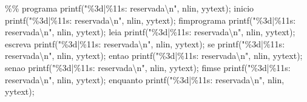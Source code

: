 \documentclass[
  brazilian,
  letterpaper,
]{book}
\newenvironment{Shaded}{\begin{snugshade}}{\end{snugshade}}
\newcommand{\NormalTok}[1]{\textcolor[rgb]{0.00,0.23,0.31}{#1}}
\newcommand{\OperatorTok}[1]{\textcolor[rgb]{0.37,0.37,0.37}{#1}}
\newcommand{\SpecialCharTok}[1]{\textcolor[rgb]{0.37,0.37,0.37}{#1}}
\newcommand{\StringTok}[1]{\textcolor[rgb]{0.13,0.47,0.30}{#1}}
\theoremstyle{plain}
\theoremstyle{definition}
\theoremstyle{remark}
\begin{document}
\begin{Shaded}
\begin{Highlighting}[]
\OperatorTok{\%\%}
\NormalTok{programa      printf}\OperatorTok{(}\StringTok{"}\SpecialCharTok{\%3d}\StringTok{|}\SpecialCharTok{\%11s}\StringTok{: reservada}\SpecialCharTok{\textbackslash{}n}\StringTok{"}\OperatorTok{,}\NormalTok{ nlin}\OperatorTok{,}\NormalTok{ yytext}\OperatorTok{);}
\NormalTok{inicio        printf}\OperatorTok{(}\StringTok{"}\SpecialCharTok{\%3d}\StringTok{|}\SpecialCharTok{\%11s}\StringTok{: reservada}\SpecialCharTok{\textbackslash{}n}\StringTok{"}\OperatorTok{,}\NormalTok{ nlin}\OperatorTok{,}\NormalTok{ yytext}\OperatorTok{);}
\NormalTok{fimprograma   printf}\OperatorTok{(}\StringTok{"}\SpecialCharTok{\%3d}\StringTok{|}\SpecialCharTok{\%11s}\StringTok{: reservada}\SpecialCharTok{\textbackslash{}n}\StringTok{"}\OperatorTok{,}\NormalTok{ nlin}\OperatorTok{,}\NormalTok{ yytext}\OperatorTok{);}
\NormalTok{leia          printf}\OperatorTok{(}\StringTok{"}\SpecialCharTok{\%3d}\StringTok{|}\SpecialCharTok{\%11s}\StringTok{: reservada}\SpecialCharTok{\textbackslash{}n}\StringTok{"}\OperatorTok{,}\NormalTok{ nlin}\OperatorTok{,}\NormalTok{ yytext}\OperatorTok{);}
\NormalTok{escreva       printf}\OperatorTok{(}\StringTok{"}\SpecialCharTok{\%3d}\StringTok{|}\SpecialCharTok{\%11s}\StringTok{: reservada}\SpecialCharTok{\textbackslash{}n}\StringTok{"}\OperatorTok{,}\NormalTok{ nlin}\OperatorTok{,}\NormalTok{ yytext}\OperatorTok{);}
\NormalTok{se            printf}\OperatorTok{(}\StringTok{"}\SpecialCharTok{\%3d}\StringTok{|}\SpecialCharTok{\%11s}\StringTok{: reservada}\SpecialCharTok{\textbackslash{}n}\StringTok{"}\OperatorTok{,}\NormalTok{ nlin}\OperatorTok{,}\NormalTok{ yytext}\OperatorTok{);}
\NormalTok{entao         printf}\OperatorTok{(}\StringTok{"}\SpecialCharTok{\%3d}\StringTok{|}\SpecialCharTok{\%11s}\StringTok{: reservada}\SpecialCharTok{\textbackslash{}n}\StringTok{"}\OperatorTok{,}\NormalTok{ nlin}\OperatorTok{,}\NormalTok{ yytext}\OperatorTok{);}
\NormalTok{senao         printf}\OperatorTok{(}\StringTok{"}\SpecialCharTok{\%3d}\StringTok{|}\SpecialCharTok{\%11s}\StringTok{: reservada}\SpecialCharTok{\textbackslash{}n}\StringTok{"}\OperatorTok{,}\NormalTok{ nlin}\OperatorTok{,}\NormalTok{ yytext}\OperatorTok{);}
\NormalTok{fimse         printf}\OperatorTok{(}\StringTok{"}\SpecialCharTok{\%3d}\StringTok{|}\SpecialCharTok{\%11s}\StringTok{: reservada}\SpecialCharTok{\textbackslash{}n}\StringTok{"}\OperatorTok{,}\NormalTok{ nlin}\OperatorTok{,}\NormalTok{ yytext}\OperatorTok{);}
\NormalTok{enquanto      printf}\OperatorTok{(}\StringTok{"}\SpecialCharTok{\%3d}\StringTok{|}\SpecialCharTok{\%11s}\StringTok{: reservada}\SpecialCharTok{\textbackslash{}n}\StringTok{"}\OperatorTok{,}\NormalTok{ nlin}\OperatorTok{,}\NormalTok{ yytext}\OperatorTok{);}

\end{Highlighting}
\end{Shaded}
\end{document}
